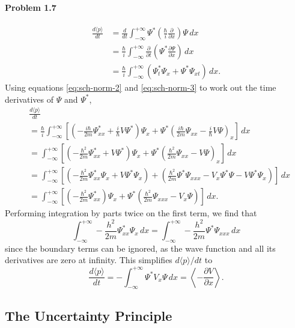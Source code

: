 \documentclass{article}
\begin{document}
\paragraph{Problem 1.7}
\begin{align*}
  \frac{d\langle p \rangle}{dt}
  &= \frac{d}{dt} \int_{-\infty}^{+\infty} \Psi^*\left(
    \frac{\hbar}{i}\frac{\partial}{\partial x}
  \right)\Psi \,dx \\
  &= \frac{\hbar}{i} \int_{-\infty}^{+\infty} \frac{\partial}{\partial t}
  \left(
    \Psi^*\frac{\partial \Psi}{\partial x}
  \right) \,dx \\
  &= \frac{\hbar}{i} \int_{-\infty}^{+\infty} \left(
    \Psi^*_t\Psi_x + \Psi^*\Psi_{xt}
  \right) \,dx.
\end{align*}
Using equations \eqref{eq:sch-norm-2} and \eqref{eq:sch-norm-3} to work out the
time derivatives of $\Psi$ and $\Psi^*$,
\begin{align*}
  &\frac{d\langle p \rangle}{dt} \\
  &= \frac{\hbar}{i} \int_{-\infty}^{+\infty} \left[
    \left(-\frac{i\hbar}{2m}\Psi^*_{xx} + \frac{i}{\hbar}V\Psi^*\right)\Psi_x
    + \Psi^*\left(\frac{i\hbar}{2m}\Psi_{xx} - \frac{i}{\hbar}V\Psi\right)_x
  \right] \,dx \\
  &= \int_{-\infty}^{+\infty} \left[
    \left(-\frac{\hbar^2}{2m}\Psi^*_{xx} + V\Psi^*\right)\Psi_x
    + \Psi^* \left(\frac{\hbar^2}{2m}\Psi_{xx} - V\Psi\right)_x
  \right] \,dx \\
  &= \int_{-\infty}^{+\infty} \left[
    \left(-\frac{\hbar^2}{2m}\Psi^*_{xx}\Psi_x + V\Psi^*\Psi_x\right)
    + \left(
      \frac{\hbar^2}{2m}\Psi^*\Psi_{xxx} - V_x\Psi^*\Psi - V\Psi^*\Psi_x
    \right)
  \right] \,dx \\
  &= \int_{-\infty}^{+\infty} \left[
    \left(-\frac{\hbar^2}{2m}\Psi^*_{xx}\right)\Psi_x
    + \Psi^*\left( \frac{\hbar^2}{2m}\Psi_{xxx} - V_x\Psi\right)
  \right] \,dx.
\end{align*}
Performing integration by parts twice on the first term, we find that \[
  \int_{-\infty}^{+\infty} -\frac{h^2}{2m}\Psi^*_{xx}\Psi_x \,dx
  = \int_{-\infty}^{+\infty} -\frac{h^2}{2m}\Psi^*\Psi_{xxx} \,dx
\]
since the boundary terms can be ignored, as the wave function and all its
derivatives are zero at infinity. This simplifies $d\langle p \rangle/dt$ to \[
  \frac{d\langle p \rangle}{dt}
  = -\int_{-\infty}^{+\infty} \Psi^*V_x\Psi \,dx
  = \left\langle-\frac{\partial V}{\partial x}\right\rangle.
\]

\subsection{The Uncertainty Principle}
\end{document}
